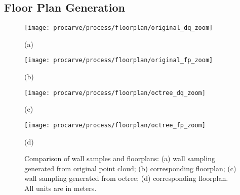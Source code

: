 \documentclass[12pt,onecolumn,oneside]{book}
\begin{document}
\subsection{Floor Plan Generation}
\label{ssec:octree_floorplan}

\begin{figure}[t]

	\begin{minipage}[t]{0.45\linewidth}
		\centerline{\texttt{[image: procarve/process/floorplan/original\_dq\_zoom]}}
		\centerline{(a)}
	\end{minipage}
	\hfill
	\begin{minipage}[t]{0.45\linewidth}
		\centerline{\texttt{[image: procarve/process/floorplan/original\_fp\_zoom]}}
		\centerline{(b)}
	\end{minipage}
	
	\begin{minipage}[t]{0.45\linewidth}
		\centerline{\texttt{[image: procarve/process/floorplan/octree\_dq\_zoom]}}
		\centerline{(c)}
	\end{minipage}
	\hfill
	\begin{minipage}[t]{0.45\linewidth}
		\centerline{\texttt{[image: procarve/process/floorplan/octree\_fp\_zoom]}}
		\centerline{(d)}
	\end{minipage}

	\caption[Comparison of wall samples and floor plans.]{Comparison of wall samples and floorplans: (a) wall sampling generated from original point cloud; (b) corresponding floorplan; (c) wall sampling generated from octree; (d) corresponding floorplan.  All units are in meters.}
	\label{fig:octree_fp_compare}
\end{figure}
\end{document}
